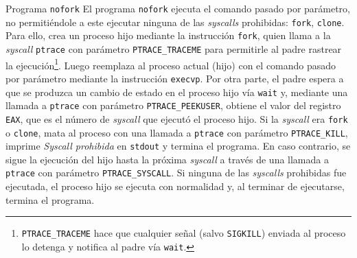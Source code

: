 \documentclass[12pt,titlepage]{article}
\newcommand{\cmd}[1]{\texttt{#1}}
\newcommand{\code}[1]{\texttt{#1}}
\newcommand{\kw}[1]{{\em #1}}
\begin{document}
\begin{section}{Programa \cmd{nofork}}
	El programa \code{nofork} ejecuta el comando pasado por	parámetro, no permitiéndole a este ejecutar ninguna de las \kw{syscalls} prohibidas: \code{fork}, \code{clone}. Para ello, crea un proceso hijo mediante la instrucción \code{fork}, quien llama a la \kw{syscall} \code{ptrace} con parámetro \code{PTRACE\_TRACEME} para permitirle al padre rastrear la ejecución\footnote{\code{PTRACE\_TRACEME} hace que cualquier señal (salvo \code{SIGKILL}) enviada al proceso lo detenga y notifica al padre vía \code{wait}.}. Luego reemplaza al proceso actual (hijo) con el comando pasado por parámetro mediante la instrucción \code{execvp}. Por otra parte, el padre espera a que se produzca un cambio de estado en el proceso hijo vía \code{wait} y, mediante una llamada a \code{ptrace} con parámetro \code{PTRACE\_PEEKUSER}, obtiene el valor del registro \code{EAX}, que es el número de \kw{syscall} que ejecutó el proceso hijo. Si la \kw{syscall} era \code{fork} o \code{clone}, mata al proceso con una llamada a \code{ptrace} con parámetro \code{PTRACE\_KILL}, imprime \kw{Syscall prohibida} en \code{stdout} y termina el programa. En caso contrario, se sigue la ejecución del hijo hasta la próxima \kw{syscall} a través de una llamada a \code{ptrace} con parámetro \code{PTRACE\_SYSCALL}. Si ninguna de las \kw{syscalls} prohibidas fue ejecutada, el proceso hijo se ejecuta con normalidad y, al terminar de ejecutarse, termina el programa.
\end{section}
\end{document}
